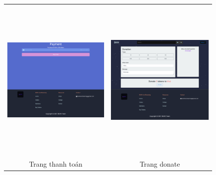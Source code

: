 \begin{center}
\begin{figure}[H]
\begin{tabular}{cc}
  \includegraphics[width=8.5cm,height=8cm]{./imgs/layouts/proceed_to_payment} &   \includegraphics[width=8.5cm,height=8cm]{./imgs/layouts/donate} \\
Trang thanh toán & Trang donate \\[6pt]
\end{tabular}
\end{figure}
\end{center}

